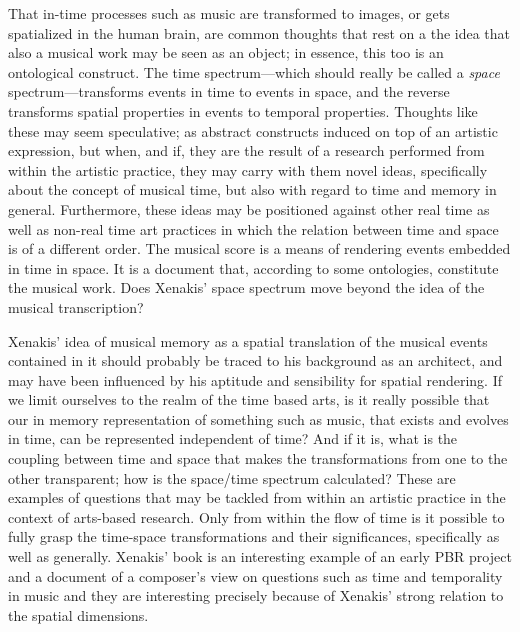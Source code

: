 That in-time processes such as music are transformed to images, or gets spatialized in the human brain, are common thoughts that rest on a the idea that also a musical work may be seen as an object; in essence, this too is an ontological construct. The time spectrum---which should really be called a \emph{space} spectrum---transforms events in time to events in space, and the reverse transforms spatial properties in events to temporal properties. Thoughts like these may seem speculative; as abstract constructs induced on top of an artistic expression, but when, and if, they are the result of a research performed from within the artistic practice, they may carry with them novel ideas, specifically about the concept of musical time, but also with regard to time and memory in general. Furthermore, these ideas may be positioned against other real time as well as non-real time art practices in which the relation between time and space is of a different order. The musical score is a means of rendering events embedded in time in space. It is a document that, according to some ontologies, constitute the musical work. Does Xenakis' space spectrum move beyond the idea of the musical transcription? 

Xenakis' idea of musical memory as a spatial translation of the musical events contained in it should probably be traced to his background as an architect, and may have been influenced by his aptitude and sensibility for spatial rendering. If we limit ourselves to the realm of the time based arts, is it really possible that our in memory representation of something such as music, that exists and evolves in time, can be represented independent of time? And if it is, what is the coupling between time and space that makes the transformations from one to the other transparent; how is the space/time spectrum calculated? These are examples of questions that may be tackled from within an artistic practice in the context of arts-based research. Only from within the flow of time is it possible to fully grasp the time-space transformations and their significances, specifically as well as generally. Xenakis' book  is an interesting example of an early PBR project and a document of a composer's view on questions such as time and temporality in music and they are interesting precisely because of Xenakis' strong relation to the spatial dimensions. %


